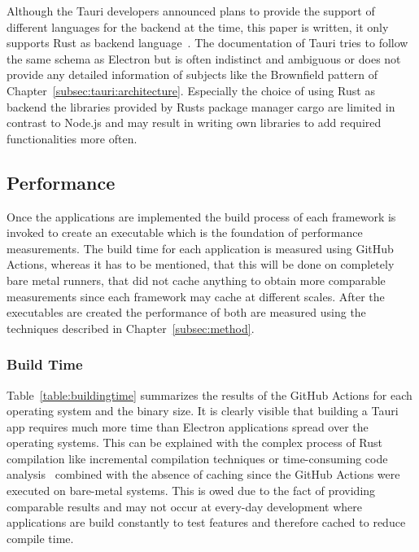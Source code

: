 Although the Tauri developers announced plans to provide the support of different languages for the backend at the time, this paper is written, it only supports Rust as backend language~\cite{tauri}.
The documentation of Tauri tries to follow the same schema as Electron but is often indistinct and ambiguous or does not provide any detailed information of subjects like the Brownfield pattern of Chapter~\ref{subsec:tauri:architecture}.
Especially the choice of using Rust as backend the libraries provided by Rusts package manager cargo are limited in contrast to Node.js and may result in writing own libraries to add required functionalities more often.

\subsection{Performance}
\label{subsec:impl:performance}
Once the applications are implemented the build process of each framework is invoked to create an executable which is the foundation of performance measurements.
The build time for each application is measured using GitHub Actions, whereas it has to be mentioned, that this will be done on completely bare metal runners, that did not cache anything to obtain more comparable measurements
since each framework may cache at different scales.
After the executables are created the performance of both are measured using the techniques described in Chapter~\ref{subsec:method}.

\subsubsection{Build Time}
\label{subsubsec:perf:buildtime}
Table~\ref{table:buildingtime} summarizes the results of the GitHub Actions for each operating system and the binary size.
It is clearly visible that building a Tauri app requires much more time than Electron applications spread over the operating systems.
This can be explained with the complex process of Rust compilation like incremental compilation techniques or time-consuming code analysis~\cite{rustCompileTime} combined with the absence
of caching since the GitHub Actions were executed on bare-metal systems.
This is owed due to the fact of providing comparable results and may not occur at every-day development where applications are build constantly to test features and therefore cached to reduce compile time.

